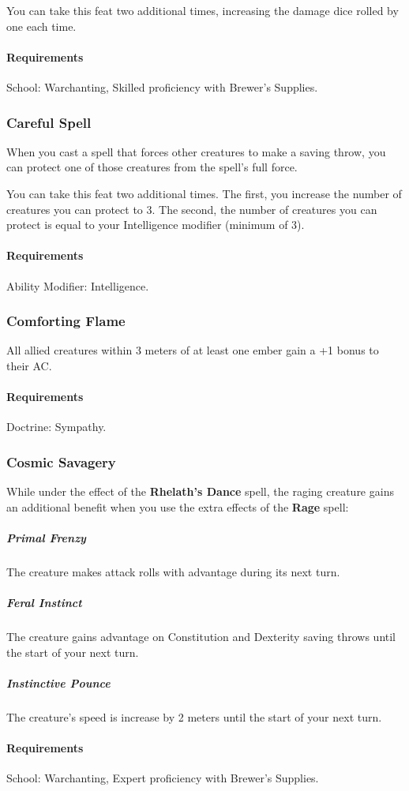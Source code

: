     You can take this feat two additional times, increasing the damage dice rolled by one each time.
    \paragraph{Requirements} School: Warchanting, Skilled proficiency with Brewer's Supplies.
\subsubsection{Careful Spell} \label{feat::carefulspell}
    When you cast a spell that forces other creatures to make a saving throw, you can protect one of those creatures from the spell's full force.

    You can take this feat two additional times.
    The first, you increase the number of creatures you can protect to 3.
    The second, the number of creatures you can protect is equal to your Intelligence modifier (minimum of 3).
    \paragraph{Requirements} Ability Modifier: Intelligence.
\subsubsection{Comforting Flame} \label{feat::comfortingflame}
    All allied creatures within 3 meters of at least one ember gain a +1 bonus to their AC.
    \paragraph{Requirements} Doctrine: Sympathy.
\subsubsection{Cosmic Savagery} \label{feat::cosmicsavaregy}
    While under the effect of the \textbf{Rhelath's Dance} spell, the raging creature gains an additional benefit when you use the extra effects of the \textbf{Rage} spell:

    \subparagraph{Primal Frenzy}
    The creature makes attack rolls with advantage during its next turn.
    \subparagraph{Feral Instinct}
    The creature gains advantage on Constitution and Dexterity saving throws until the start of your next turn.
    \subparagraph{Instinctive Pounce}
    The creature's speed is increase by 2 meters until the start of your next turn.
    \paragraph{Requirements} School: Warchanting, Expert proficiency with Brewer's Supplies.
